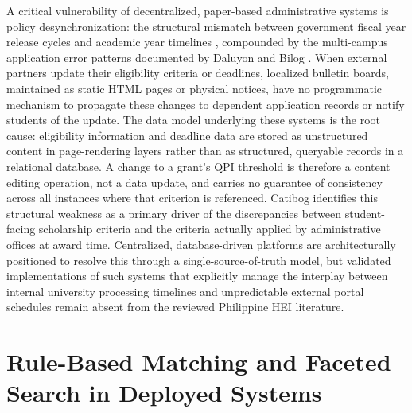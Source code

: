 A critical vulnerability of decentralized, paper-based administrative systems is policy desynchronization: the structural mismatch between government fiscal year release cycles and academic year timelines \cite{ref16}, compounded by the multi-campus application error patterns documented by Daluyon and Bilog \cite{ref14}. When external partners update their eligibility criteria or deadlines, localized bulletin boards, maintained as static HTML pages or physical notices, have no programmatic mechanism to propagate these changes to dependent application records or notify students of the update. The data model underlying these systems is the root cause: eligibility information and deadline data are stored as unstructured content in page-rendering layers rather than as structured, queryable records in a relational database. A change to a grant's QPI threshold is therefore a content editing operation, not a data update, and carries no guarantee of consistency across all instances where that criterion is referenced. Catibog \cite{ref16} identifies this structural weakness as a primary driver of the discrepancies between student-facing scholarship criteria and the criteria actually applied by administrative offices at award time. Centralized, database-driven platforms are architecturally positioned to resolve this through a single-source-of-truth model, but validated implementations of such systems that explicitly manage the interplay between internal university processing timelines and unpredictable external portal schedules remain absent from the reviewed Philippine HEI literature.

\section{Rule-Based Matching and Faceted Search in Deployed Systems}

